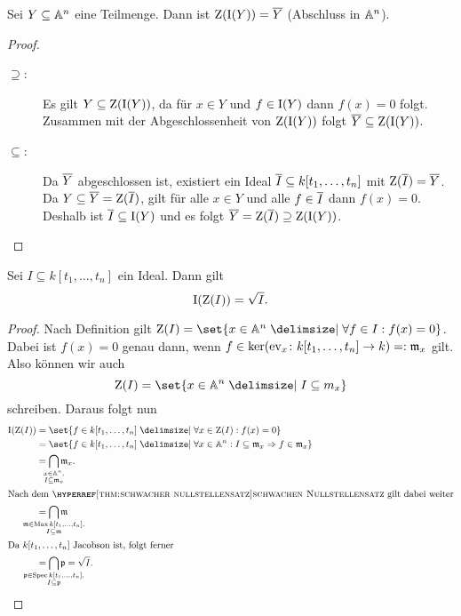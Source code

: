 \documentclass[12pt,a4paper]{scrartcl}
\theoremstyle{cplain}
\theoremstyle{cdef}
\begin{document}
\begin{lem} \label{lem:8.12}
	Sei $Y\subseteq \mathbb A^n$ eine Teilmenge. Dann ist $\operatorname{Z}(\operatorname{I}(Y)) = \overline{Y}$ (Abschluss in $\mathbb A^n$).
\end{lem}
\begin{proof}
	\leavevmode
	\begin{description}
		\item[\glqq$\supseteq$\grqq:] Es gilt $Y\subseteq \operatorname{Z}(\operatorname{I}(Y))$, da für $x\in Y$ und $f\in \operatorname{I}(Y)$ dann $f(x) = 0$ folgt. Zusammen mit der Abgeschlossenheit von $\operatorname{Z}(\operatorname{I}(Y))$ folgt $\overline{Y}\subseteq \operatorname{Z}(\operatorname{I}(Y))$.
		\item[\glqq$\subseteq$\grqq:] Da $\overline{Y}$ abgeschlossen ist, existiert ein Ideal $\overline{I}\subseteq k[t_1,\dots, t_n]$ mit $\operatorname{Z}(\overline{I}) = \overline{Y}$. Da $Y\subseteq \overline{Y} = \operatorname{Z}(\overline{I})$, gilt für alle $x\in Y$ und alle $f\in\overline{I}$ dann $f(x) = 0$. Deshalb ist $\overline{I}\subseteq \operatorname{I}(Y)$ und es folgt $\overline{Y} = \operatorname{Z}(\overline{I}) \supseteq \operatorname{Z}(\operatorname{I}(Y))$.
		\qedhere
	\end{description}
\end{proof}
\begin{satz} \label{thm:hilberts nullstellensatz}
	Sei $I\subseteq k[t_1,\dots, t_n]$ ein Ideal. Dann gilt \[\operatorname{I}(\operatorname{Z}(I)) = \sqrt{I}.\]
\end{satz}

\begin{proof}
	Nach Definition gilt $\Z(I) = \set{x\in\IA^n\given \forall f\in I: f(x) = 0}$. Dabei ist $f(x) = 0$ genau dann, wenn $f\in \operatorname{ker}(\operatorname{ev}_x\colon k[t_1,\dots, t_n]\to k) =: \mathfrak{m}_x$ gilt. Also können wir auch \[\Z(I) = \set{x\in\IA^n\given I\subseteq m_x}\] schreiben. Daraus folgt nun
	\begin{align*}
		\I(\Z(I)) &= \set{f\in k[t_1,\dots, t_n]\given \forall x \in \Z(I): f(x) = 0} \\
		&= \set{f\in k[t_1,\dots, t_n] \given \forall x\in\IA^n: I\subseteq \fm_x\Rightarrow f\in \fm_x}\\
		&= \bigcap_{\mathclap{\substack{x\in\IA^n,\\I\subseteq \fm_x}}}\fm_x. \\
	\intertext{Nach dem \hyperreff[thm:schwacher nullstellensatz]{schwachen Nullstellensatz} gilt dabei weiter}
		&= \bigcap_{\mathclap{\substack{\fm\in\Max k[t_1,\dots,t_n],\\I\subseteq \fm}}}\fm \\
	\intertext{Da $k[t_1,\dots, t_n]$ Jacobson ist, folgt ferner}
		&= \bigcap_{\mathclap{\substack{\fp\in\Spec k[t_1,\dots,t_n],\\I\subseteq \fp}}}\fp = \sqrt I.
	\end{align*}\qedhere %
\end{proof}
\end{document}
